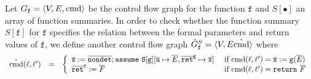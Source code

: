 
Let $G_{\mathtt{f}} = \langle V, E, \textmd{cmd} \rangle$ be the
control flow graph for the function $\mathtt{f}$ and $S[\bullet]$ an
array of function summaries. In order to check whether the function
summary $S[{\mathtt{f}}]$ for $\mathtt{f}$ specifies the relation 
between the formal parameters and return values of $\mathtt{f}$, 
we define another control flow graph
$\hat{G}_{\mathtt{f}}^S = \langle V, E \hat{\textmd{cmd}}
\rangle$ where
\begin{equation*}
  \begin{array}{rcl}
    \hat{\textmd{cmd}} (\ell, \ell') & = &
    \left\{
      \begin{array}{ll}
        \overline{\mathtt{x}} := 
        \overline{\mathtt{nondet}};
        \mathtt{assume\ S[{\mathtt{g}}]}[
        \overline{\mathtt{u}} \mapsto \overline{E},
        \mathtt{\overline{ret}^g} \mapsto \overline{\mathtt{x}}]    
        &
        \textmd{ if } \textmd{cmd} (\ell, \ell') = 
        \overline{\mathtt{x}} := \mathtt{g} (\overline{E})\\
        \mathtt{\overline{ret}^f} := \overline{F}
        &
        \textmd{ if } \textmd{cmd} (\ell, \ell') = \mathtt{return\ }
        \overline{F}
      \end{array}
    \right.
  \end{array}
\end{equation*}

